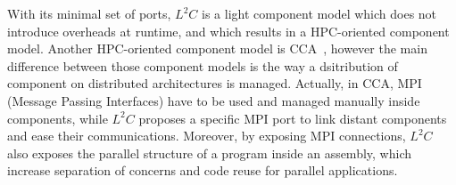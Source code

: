 With its minimal set of ports, $L^2C$ is a light component model which does not introduce overheads at runtime, and which results in a HPC-oriented component model. Another HPC-oriented component model is CCA~\cite{Armstrong:1999:TCC:822084.823232}, however the main difference between those component models is the way a dsitribution of component on distributed architectures is managed. Actually, in CCA, MPI~\cite{} (Message Passing Interfaces) have to be used and managed manually inside components, while $L^2C$ proposes a specific MPI port to link distant components and ease their communications. Moreover, by exposing MPI connections, $L^2C$ also exposes the parallel structure of a program inside an assembly, which increase separation of concerns and code reuse for parallel applications.

